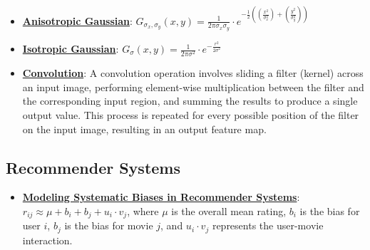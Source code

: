 \documentclass{article}%
\begin{document}
\begin{itemize}[leftmargin=*]
\item \href{https://purdue.brightspace.com/d2l/common/assets/pdfjs-d2l-dist/1.0.14-legacy/web/viewer.html?file=%2Fcontent%2Fenforced%2F1095467-wl.202510.CS.24300.001%2F08L2-Feature Extraction.pdf%3Fou%3D1095467&lang=en-us&container=d2l-fileviewer-rendered-pdf&fullscreen=d2l-fileviewer-rendered-pdf-dialog&height=667#page=43}{\textbf{Anisotropic Gaussian}}: $G_{\sigma_x, \sigma_y}(x, y) = \frac{1}{2\pi\sigma_x\sigma_y} \cdot e^{-\frac{1}{2}((\frac{x^2}{\sigma_x^2}) + (\frac{y^2}{\sigma_y^2}))}$%
\item \href{https://purdue.brightspace.com/d2l/common/assets/pdfjs-d2l-dist/1.0.14-legacy/web/viewer.html?file=%2Fcontent%2Fenforced%2F1095467-wl.202510.CS.24300.001%2F08L2-Feature Extraction.pdf%3Fou%3D1095467&lang=en-us&container=d2l-fileviewer-rendered-pdf&fullscreen=d2l-fileviewer-rendered-pdf-dialog&height=667#page=43}{\textbf{Isotropic Gaussian}}: $G_\sigma(x, y) = \frac{1}{2\pi\sigma^2} \cdot e^{-\frac{r^2}{2\sigma^2}}$%
\item \href{https://purdue.brightspace.com/d2l/common/assets/pdfjs-d2l-dist/1.0.14-legacy/web/viewer.html?file=%2Fcontent%2Fenforced%2F1095467-wl.202510.CS.24300.001%2F09L1-cnn.pdf%3Fou%3D1095467&lang=en-us&container=d2l-fileviewer-rendered-pdf&fullscreen=d2l-fileviewer-rendered-pdf-dialog&height=667#page=6}{\textbf{Convolution}}: A convolution operation involves sliding a filter (kernel) across an input image, performing element-wise multiplication between the filter and the corresponding input region, and summing the results to produce a single output value. This process is repeated for every possible position of the filter on the input image, resulting in an output feature map.%
\end{itemize}

%
\subsection{Recommender Systems}%
\label{subsec:RecommenderSystems}%
\begin{itemize}[leftmargin=*]%
\item \href{https://purdue.brightspace.com/d2l/common/assets/pdfjs-d2l-dist/1.0.14-legacy/web/viewer.html?file=%2Fcontent%2Fenforced%2F1095467-wl.202510.CS.24300.001%2F11L2-svd-pca-recommender.pdf%3Fou%3D1095467&lang=en-us&container=d2l-fileviewer-rendered-pdf&fullscreen=d2l-fileviewer-rendered-pdf-dialog&height=667#page=44}{\textbf{Modeling Systematic Biases in Recommender Systems}}: $r_{ij} \approx \mu + b_i + b_j + u_i \cdot v_j$, where $\mu$ is the overall mean rating, $b_i$ is the bias for user $i$, $b_j$ is the bias for movie $j$, and $u_i \cdot v_j$ represents the user-movie interaction.%
\end{itemize}
\end{document}
